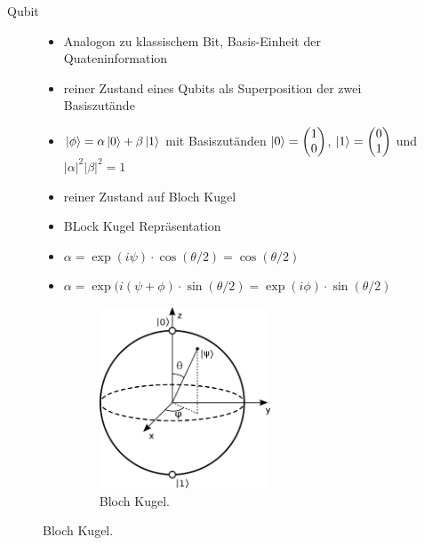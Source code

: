 \documentclass[aspectratio=1610, 9pt]{beamer}
\begin{document}
\begin{frame}{Qubit}
  \begin{figure}
    \begin{minipage}{0.49\textwidth}
      \begin{itemize}
        \item Analogon zu klassischem Bit, Basis-Einheit der Quateninformation
        \item reiner Zustand eines Qubits als Superposition der zwei Basiszutände
        \item[] $\ket{\phi} = \alpha \ket{0} + \beta \ket{1} $ mit Basiszutänden $\ket{0} = \begin{pmatrix}1\\0\end{pmatrix}$, $\ket{1} = \begin{pmatrix}0\\1\end{pmatrix}$ und $|\alpha|^2 |\beta|^2 = 1$
        \item reiner Zustand auf Bloch Kugel
      \end{itemize}
    \end{minipage}
    \hfill
    \begin{minipage}{0.49\textwidth}
      \begin{itemize}
        \item BLock Kugel Repräsentation
        \item[] $\alpha = \exp(i\psi) \cdot \cos(\theta/2) = \cos(\theta/2)$
        \item[] $\alpha = \exp(i(\psi+\phi) \cdot \sin(\theta/2) = \exp(i\phi) \cdot \sin(\theta/2)$
        \begin{figure}
          \includegraphics[width=0.6\textwidth]{images/Bloch.png}
          \caption{Bloch Kugel.}
        \end{figure}
      \end{itemize}
    \end{minipage}
  \end{figure}
\end{frame}
\end{document}
